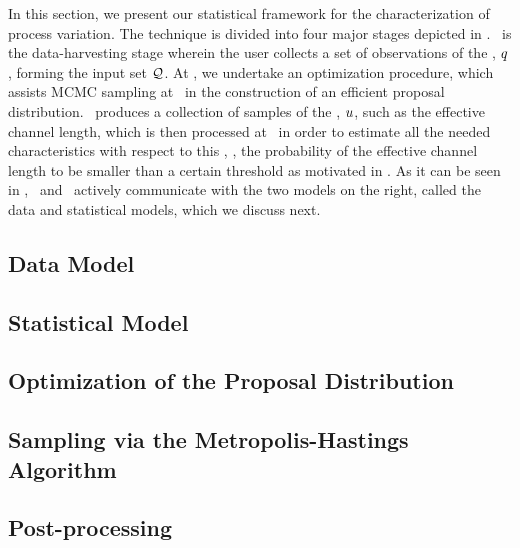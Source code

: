 
In this section, we present our statistical framework for the characterization of process variation.
The technique is divided into four major stages depicted in .
\ is the data-harvesting stage wherein the user collects a set of observations of the \qom, $q$, forming the input set $\mathcal{Q}$.
At , we undertake an optimization procedure, which assists MCMC sampling at \ in the construction of an efficient proposal distribution.
\ produces a collection of samples of the \qoi, $u$, such as the effective channel length, which is then processed at \ in order to estimate all the needed characteristics with respect to this \qoi, \eg, the probability of the effective channel length to be smaller than a certain threshold as motivated in .
As it can be seen in , \ and \ actively communicate with the two models on the right, called the data and statistical models, which we discuss next.

\subsection{Data Model} 



\subsection{Statistical Model} 


\subsection{Optimization of the Proposal Distribution} 


\subsection{Sampling via the Metropolis-Hastings Algorithm} 


\subsection{Post-processing} 

